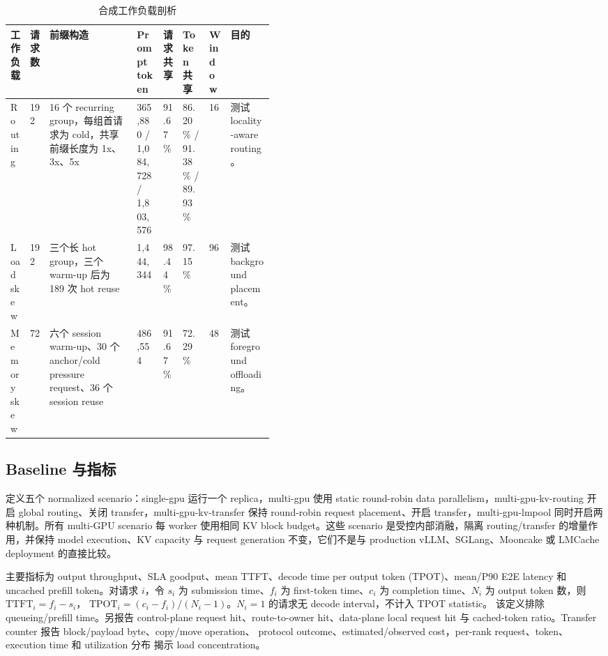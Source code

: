\documentclass[11pt,a4paper]{article}
\begin{document}
\begin{CJK*}{UTF8}{gbsn}
\begin{table}[!htbp]\centering\caption{合成工作负载剖析}\label{tab:datasets}\scriptsize
\setlength{\tabcolsep}{1.5pt}\renewcommand{\arraystretch}{1.08}
\begin{tabularx}{\linewidth}{@{}L{0.07\linewidth}L{0.05\linewidth}Y L{0.10\linewidth}L{0.07\linewidth}L{0.10\linewidth}L{0.05\linewidth}Y@{}}\toprule
工作负载 & 请求数 & 前缀构造 & Prompt token & 请求共享 & Token 共享 & Window & 目的\\\midrule
Routing & 192 & 16 个 recurring group，每组首请求为 cold，共享前缀长度为 1x、3x、5x & 365,880 / 1,084,728 / 1,803,576 & 91.67\% & 86.20\% / 91.38\% / 89.93\% & 16 & 测试 locality-aware routing。\\
Load skew & 192 & 三个长 hot group，三个 warm-up 后为 189 次 hot reuse & 1,444,344 & 98.44\% & 97.15\% & 96 & 测试 background placement。\\
Memory skew & 72 & 六个 session warm-up、30 个 anchor/cold pressure request、36 个 session reuse & 486,554 & 91.67\% & 72.29\% & 48 & 测试 foreground offloading。\\\bottomrule
\end{tabularx}\end{table}

\subsection{Baseline 与指标}

定义五个 normalized scenario：single-gpu 运行一个 replica，multi-gpu 使用 static round-robin data
parallelism，multi-gpu-kv-routing 开启 global routing、关闭 transfer，multi-gpu-kv-transfer 保持
round-robin request placement、开启 transfer，multi-gpu-lmpool 同时开启两种机制。所有 multi-GPU
scenario 每 worker 使用相同 KV block budget。这些 scenario 是受控内部消融，隔离 routing/transfer
的增量作用，并保持 model execution、KV capacity 与 request generation 不变，它们不是与 production
vLLM、SGLang、Mooncake 或 LMCache deployment 的直接比较。

主要指标为 output throughput、SLA goodput、mean TTFT、decode time per output token (TPOT)、mean/P90
E2E latency 和 uncached prefill token。对请求 $i$，令 $s_i$ 为 submission time、$f_i$ 为 first-token
time、$c_i$ 为 completion time、$N_i$ 为 output token 数，则 $\mathrm{TTFT}_i=f_i-s_i$，
$\mathrm{TPOT}_i=(c_i-f_i)/(N_i-1)$。$N_i=1$ 的请求无 decode interval，不计入 TPOT statistic。
该定义排除 queueing/prefill time。另报告 control-plane request hit、route-to-owner hit、data-plane
local request hit 与 cached-token ratio。Transfer counter 报告 block/payload byte、copy/move operation、
protocol outcome、estimated/observed cost，per-rank request、token、execution time 和 utilization 分布
揭示 load concentration。


\end{CJK*}
\end{document}
